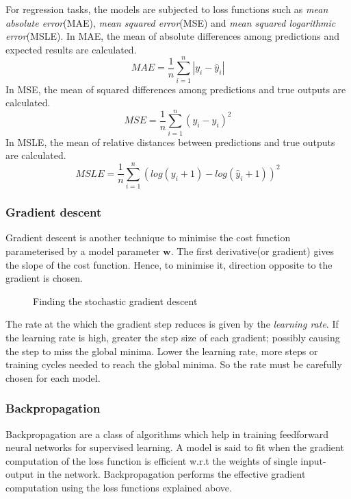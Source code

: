 For regression tasks, the models are subjected to loss functions such as \textit{mean
absolute error}(MAE), \textit{mean squared error}(MSE) and \textit{mean squared
logarithmic error}(MSLE). In MAE, the mean of absolute differences among predictions and
expected results are calculated.
\begin{equation}
    MAE = \frac{1}{n}\sum_{i=1}^n\left |y_i -\hat y_i \right|
\end{equation}
In MSE, the mean of squared differences among predictions and true outputs are
calculated.
\begin{equation}
    MSE = \frac{1}{n}\sum_{i=1}^n (y_i - \hat y_i)^2
\end{equation}
In MSLE, the mean of relative distances between predictions and true outputs are
calculated.
\begin{equation}
    MSLE = \frac{1}{n}\sum_{i=1}^n(log(y_i+1)-log(\hat y_i+1))^2
\end{equation}

\subsubsection*{Gradient descent} \label{gradientdescent}
Gradient descent is another technique to minimise the cost function parameterised by a
model parameter $\mathbf{w}$. The first derivative(or gradient) gives the slope of the
cost function. Hence, to minimise it, direction opposite to the gradient is chosen.

\begin{figure}[h]
	\centering
    \def\svgwidth{0.5\textwidth}
        
    \caption{Finding the stochastic gradient descent}
    \label{fig:gradientdescent}
\end{figure}

The rate at the which the gradient step reduces is given by the \textit{learning rate}. If
the learning rate is high, greater the step size of each gradient; possibly causing the
step to miss the global minima. Lower the learning rate, more steps or training cycles
needed to reach the global minima. So the rate must be carefully chosen for each model.

\subsubsection*{Backpropagation}
Backpropagation are a class of algorithms which help in training feedforward neural
networks for supervised learning. A model is said to fit when the gradient computation of
the loss function is efficient w.r.t the weights of single input-output in the network.
Backpropagation performs the effective gradient computation using the loss functions
explained above.


